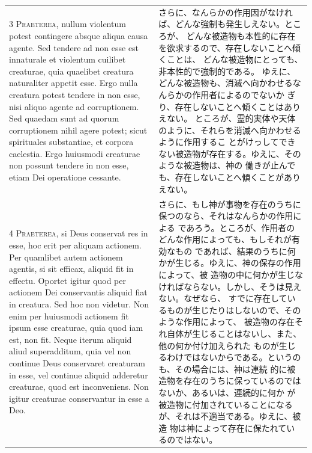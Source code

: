 \documentclass[paper=a4paper,fontsize=10pt,jafontsize=9pt,titlepage]{jlreq}
\begin{document}
\begin{longtable}{p{21em}p{21em}}
\\


{\scshape 3 Praeterea}, nullum violentum potest
contingere absque aliqua causa agente. Sed tendere ad non esse est
innaturale et violentum cuilibet creaturae, quia quaelibet creatura
naturaliter appetit esse. Ergo nulla creatura potest tendere in non
esse, nisi aliquo agente ad corruptionem. Sed quaedam sunt ad quorum
corruptionem nihil agere potest; sicut spirituales substantiae, et
corpora caelestia. Ergo huiusmodi creaturae non possunt tendere in non
esse, etiam Dei operatione cessante.

&

さらに、なんらかの作用因がなければ、どんな強制も発生しえない。ところが、
 どんな被造物も本性的に存在を欲求するので、存在しないことへ傾くことは、
どんな被造物にとっても、非本性的で強制的である。
ゆえに、どんな被造物も、消滅へ向かわせるなんらかの作用者によるのでないか
 ぎり、存在しないことへ傾くことはありえない。
ところが、霊的実体や天体のように、それらを消滅へ向かわせるように作用するこ
 とがけっしてできない被造物が存在する。ゆえに、そのような被造物は、神の
 働きが止んでも、存在しないことへ傾くことがありえない。

\\


{\scshape 4 Praeterea}, si Deus conservat res in esse,
hoc erit per aliquam actionem. Per quamlibet autem actionem agentis, si
sit efficax, aliquid fit in effectu. Oportet igitur quod per actionem
Dei conservantis aliquid fiat in creatura. Sed hoc non videtur. Non enim
per huiusmodi actionem fit ipsum esse creaturae, quia quod iam est, non
fit. Neque iterum aliquid aliud superadditum, quia vel non continue Deus
conservaret creaturam in esse, vel continue aliquid adderetur creaturae,
quod est inconveniens. Non igitur creaturae conservantur in esse a Deo.

&

さらに、もし神が事物を存在のうちに保つのなら、それはなんらかの作用による
 であろう。ところが、作用者のどんな作用によっても、もしそれが有効なもの
 であれば、結果のうちに何かが生じる。ゆえに、神の保存の作用によって、被
 造物の中に何かが生じなければならない。しかし、そうは見えない。なぜなら、
 すでに存在しているものが生じたりはしないので、そのような作用によって、
 被造物の存在それ自体が生じることはないし、また、他の何か付け加えられた
 ものが生じるわけではないからである。というのも、その場合には、神は連続
 的に被造物を存在のうちに保っているのではないか、あるいは、連続的に何か
 が被造物に付加されていることになるが、それは不適当である。ゆえに、被造
 物は神によって存在に保たれているのではない。


\end{longtable}
\end{document}
